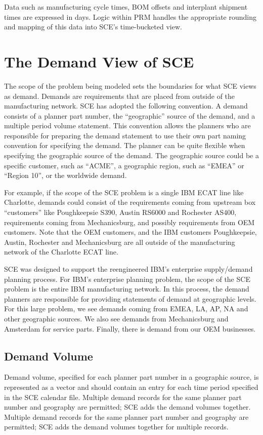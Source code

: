 Data such as manufacturing cycle times, BOM offsets and interplant
shipment times are expressed in days.  Logic within PRM handles the
appropriate rounding and mapping of this data into SCE's time-bucketed
view.

\section{The Demand View of SCE}
The scope of the problem being modeled sets the boundaries for what
SCE views as demand.  Demands are requirements that are placed from
outside of the manufacturing network.  SCE has adopted the following
convention.  A demand consists of a planner part number, the
``geographic'' source of the demand, and a multiple period
volume statement.  This convention allows the planners who are
responsible for preparing the demand statement to use their own part
naming convention for specifying the demand.  The planner can be quite
flexible when specifying the geographic source of the demand.  The
geographic source could be a specific customer, such as ``ACME'', a
geographic region, such as ``EMEA'' or ``Region 10'', or the worldwide
demand.

For example, if the scope of the SCE problem is a single IBM ECAT line
like Charlotte, demands could consist of the requirements coming from
upstream box ``customers'' like Poughkeepsie S390, Austin RS6000 and
Rochester AS400, requirements coming from Mechanicsburg, and possibly
requirements from OEM customers.  Note that the OEM customers, and the
IBM customers Poughkeepsie, Austin, Rochester and Mechanicsburg are
all outside of the manufacturing network of the Charlotte ECAT line.

SCE was designed to support the reengineered IBM's enterprise
supply/demand planning process.  For IBM's enterprise planning
problem, the scope of the SCE problem is the entire IBM manufacturing
network.  In this process, the demand planners are responsible for
providing statements of demand at geographic levels.  For this large
problem, we see demands coming from EMEA, LA, AP, NA and other
geographic sources.  We also see demands from Mechanicsburg and
Amsterdam for service parts.  Finally, there is demand from our OEM
businesses.

\subsection{Demand Volume}
Demand volume, specified for each planner part number in a geographic
source, is represented as a vector and should contain an entry for
each time period specified in the SCE calendar file.  Multiple demand
records for the same planner part number and geography are permitted;
SCE adds the demand volumes together.   Multiple demand records for 
the same planner part number and geography are
permitted;  SCE adds the demand volumes together for multiple records.


